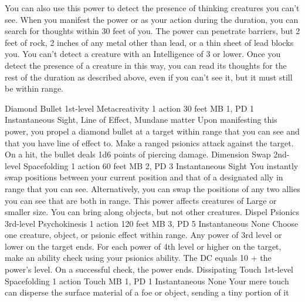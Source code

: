 You can also use this power to detect the presence of thinking creatures
you can't see.
When you manifest the power or as your action during the duration,
you can search for thoughts within 30 feet of you.
The power can penetrate barriers,
but 2 feet of rock, 2 inches of any metal other than lead,
or a thin sheet of lead blocks you.
You can't detect a creature with an Intelligence of 3 or lower.
Once you detect the presence of a creature in this way,
you can read its thoughts for the rest of the duration as described above,
even if you can't see it, but it must still be within range.

\DndPowerHeader%
    {Diamond Bullet\label{pwr:diamond_bullet}}
    {1st-level Metacreativity}
    {1 action}
    {30 feet}
    {MB 1, PD 1}
    {Instantaneous}
    {Sight, Line of Effect, Mundane matter}
Upon manifesting this power, you propel a
diamond bullet at a target within range that you can see and
that you have line of effect to. Make a ranged psionics attack
against the target. On a hit, the bullet deals 1d6 points
of piercing damage.
\DndPowerHeader%
    {Dimension Swap\label{pwr:dimension_swap}}
    {2nd-level Spacefolding}
    {1 action}
    {60 feet}
    {MB 2, PD 3}
    {Instantaneous}
    {Sight}
You instantly swap positions between your
current position and that of a designated ally in range that
you can see. Alternatively, you can swap the positions of
any two allies you can see that are both in range. This power
affects creatures of Large or smaller size. You can bring
along objects, but not other creatures.
\DndPowerHeader%
    {Dispel Psionics\label{pwr:dispel_psionics}}
    {3rd-level Psychokinesis}
    {1 action}
    {120 feet}
    {MB 3, PD 5}
    {Instantaneous}
    {None}
Choose one creature, object, or psionic effect
within range. Any power of 3rd level or lower on the target
ends. For each power of 4th level or higher on the target,
make an ability check using your psionics ability. The DC
equals 10 + the power's level. On a successful check, the
power ends.
\DndPowerHeader%
    {Dissipating Touch\label{pwr:dissipating_touch}}
    {1st-level Spacefolding}
    {1 action}
    {Touch}
    {MB 1, PD 1}
    {Instantaneous}
    {None}
Your mere touch can disperse the surface
material of a foe or object, sending a tiny portion of it
